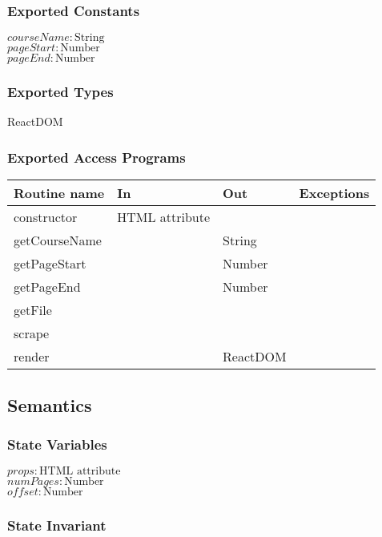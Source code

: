 \documentclass[12pt, titlepage]{article}
\begin{document}
\subsubsection{Exported Constants}

$\mathit{courseName}: \text{String}$\\
$\mathit{pageStart}: \text{Number}$\\
$\mathit{pageEnd}: \text{Number}$

\subsubsection{Exported Types}

ReactDOM

\subsubsection{Exported Access Programs}

\begin{tabular}{| l | l | l | l |}
  \hline
  \textbf{Routine name} & \textbf{In} & \textbf{Out} & \textbf{Exceptions}\\
  \hline
  constructor & HTML attribute & ~ & ~\\
  \hline
  getCourseName & ~ & String & ~\\
  \hline
  getPageStart & ~ & Number & ~\\
  \hline
  getPageEnd & ~ & Number & ~\\
  \hline
  getFile & ~ & ~ & ~\\
  \hline
  scrape & ~ & ~ & ~\\
  \hline
  render & ~ & ReactDOM & ~\\
  \hline
\end{tabular}

\subsection{Semantics}

\subsubsection{State Variables}

$\mathit{props}: \text{HTML attribute}$\\
$\mathit{numPages}: \text{Number}$\\
$\mathit{offset}: \text{Number}$

\subsubsection{State Invariant}
\end{document}
